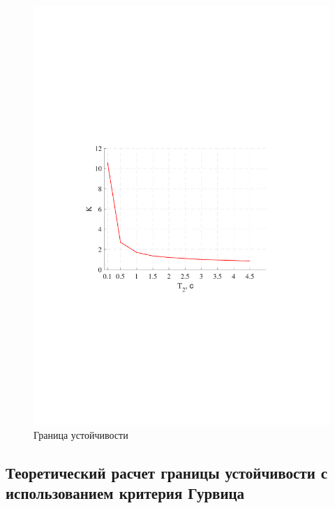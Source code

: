 \documentclass[a4paper,12pt]{article}
\begin{document}
	\begin{figure}[h!]
		\renewcommand{\figurename}{Рисунок}
		\centering
		\includegraphics[width=6in]{GranitsaMOD.pdf}
		\caption{Граница устойчивости}
		\label{s_3}
	\end{figure}


	\clearpage
	
	\begin{center}
	\section{Теоретический расчет границы устойчивости с использованием критерия Гурвица}
	\end{center}
	\noindent
	
\end{document}
